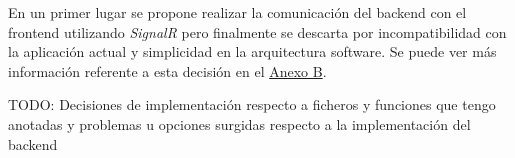 En un primer lugar se propone realizar la comunicación del backend con el frontend utilizando \textit{SignalR} \cite{signalr} pero finalmente se descarta por incompatibilidad con la aplicación actual y simplicidad en la arquitectura software. Se puede ver más información referente a esta decisión en el \hyperref[anexo-b]{Anexo B}. \newline

TODO: Decisiones de implementación respecto a ficheros y funciones que tengo anotadas y problemas u opciones surgidas respecto a la implementación del backend






